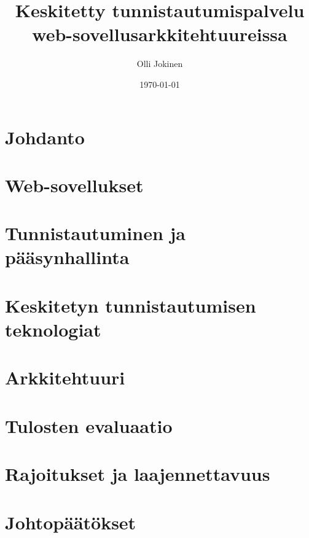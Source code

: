 \documentclass{tktltiki}
\begin{document}
\title{Keskitetty tunnistautumispalvelu web-sovellusarkkitehtuureissa}
\author{Olli Jokinen}
\date{\today}
\maketitle
\doublespacing
{}
\subject{Tietojenkäsittelytiede}
\additionalinformation{}
\begin{abstract}

\end{abstract}
\mytableofcontents
\section{Johdanto}

\section{Web-sovellukset}

\section{Tunnistautuminen ja pääsynhallinta}

\section{Keskitetyn tunnistautumisen teknologiat}

\section{Arkkitehtuuri}

\section{Tulosten evaluaatio}

\section{Rajoitukset ja laajennettavuus}

\section{Johtopäätökset}

\newpage


\lastpage
\end{document}
